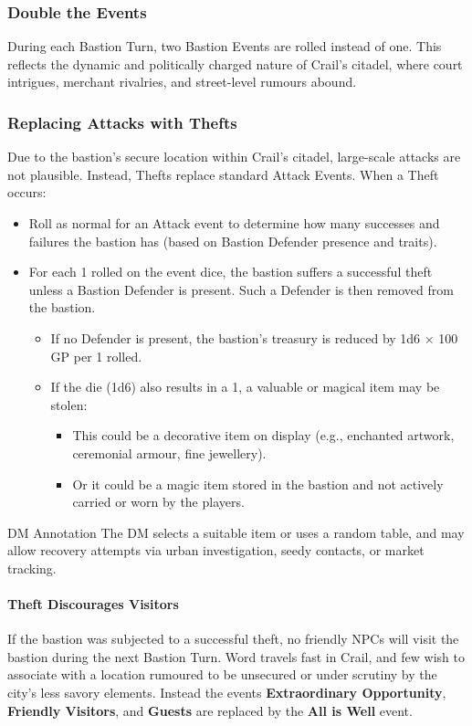 \subsubsection*{Double the Events}
{\entryfont During each Bastion Turn, two Bastion Events are rolled instead of one. This reflects the dynamic and politically charged nature of Crail's citadel, where court intrigues, merchant rivalries, and street-level rumours abound.}
\subsubsection*{Replacing Attacks with Thefts}
{\entryfont Due to the bastion's secure location within Crail's citadel, large-scale attacks are not plausible. Instead, Thefts replace standard Attack Events. When a Theft occurs:
\begin{itemize}
	\item Roll as normal for an Attack event to determine how many successes and failures the bastion has (based on Bastion Defender presence and traits).
	\item For each 1 rolled on the event dice, the bastion suffers a successful theft unless a Bastion Defender is present. Such a Defender is then removed from the bastion.
	\begin{itemize}
		\item If no Defender is present, the bastion's treasury is reduced by 1d6 × 100 GP per 1 rolled.
		\item If the die (1d6) also results in a 1, a valuable or magical item may be stolen:
		\begin{itemize}
			\item This could be a decorative item on display (e.g., enchanted artwork, ceremonial armour, fine jewellery).
			\item Or it could be a magic item stored in the bastion and not actively carried or worn by the players.
		\end{itemize}
	\end{itemize}
\end{itemize}
}
\begingroup
	\DndSetThemeColor[PhbTan]
	\begin{DndComment}{DM Annotation}
		The DM selects a suitable item or uses a random table, and may allow recovery attempts via urban investigation, seedy contacts, or market tracking.
	\end{DndComment}
\endgroup
\paragraph*{Theft Discourages Visitors}
{\entryfont If the bastion was subjected to a successful theft, no friendly NPCs will visit the bastion during the next Bastion Turn. Word travels fast in Crail, and few wish to associate with a location rumoured to be unsecured or under scrutiny by the city's less savory elements. Instead the events \textbf{Extraordinary Opportunity}, \textbf{Friendly Visitors}, and \textbf{Guests} are replaced by the \textbf{All is Well} event.}
